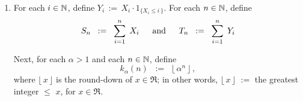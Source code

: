\begin{enumerate}
\item

For each $i \in \mathbb{N}$, define $Y_{i} \,:=\, X_{i} \cdot 1_{\{X_{i} \leq i\,\}}$.
For each $n \in \mathbb{N}$, define
\begin{equation*}
S_{n} \;\; := \;\; \overset{n}{\underset{i=1}{\sum}} \;\, X_{i}
\quad\;\;\textnormal{and}\quad\;\;
T_{n} \;\; := \;\; \overset{n}{\underset{i=1}{\sum}} \;\, Y_{i}
\end{equation*}

Next, for each $\alpha > 1$ and each $n \in \mathbb{N}$, define
\begin{equation*}
k_{\alpha}(n)
\;\; := \;\;
	\lfloor\, \alpha^{n} \,\rfloor\,,
\end{equation*}
where $\lfloor\,x\,\rfloor$ is the round-down of $x \in \Re$; in other words,
$\lfloor\,x\,\rfloor$ \;$:=$\; the greatest integer $\leq$ $x$, for $x \in \Re$.


\end{enumerate}
